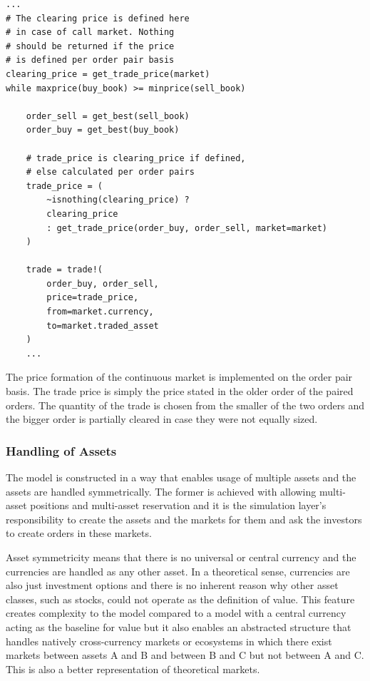 \begin{lstlisting}[caption={Clearing process},label={lst:clearing}]
...
# The clearing price is defined here
# in case of call market. Nothing
# should be returned if the price
# is defined per order pair basis
clearing_price = get_trade_price(market)
while maxprice(buy_book) >= minprice(sell_book)

    order_sell = get_best(sell_book)
    order_buy = get_best(buy_book)
    
    # trade_price is clearing_price if defined,
    # else calculated per order pairs
    trade_price = (
        ~isnothing(clearing_price) ? 
        clearing_price
        : get_trade_price(order_buy, order_sell, market=market)
    )

    trade = trade!(
        order_buy, order_sell, 
        price=trade_price, 
        from=market.currency, 
        to=market.traded_asset
    )
    ...
\end{lstlisting}

The price formation of the continuous market is implemented
on the order pair basis. The trade price is simply the price
stated in the older order of the paired orders. %
The quantity of the trade is chosen from the smaller of the two orders
and the bigger order is partially cleared in case they were not 
equally sized.



\subsubsection{Handling of Assets}

The model is constructed in a way that enables usage of multiple assets
and the assets are handled symmetrically. The former is achieved with
allowing multi-asset positions and multi-asset reservation and 
it is the simulation layer's responsibility to create the assets and the 
markets for them and ask the investors to create orders in these markets. 

Asset symmetricity means that there is no universal or central currency 
and the currencies are handled as any other asset. In a theoretical sense, 
currencies are also just investment options and there is no inherent reason why other 
asset classes, such as stocks, could not operate as the definition 
of value. This feature creates complexity to the model compared to a model
with a central currency acting as the baseline for value but it also enables an
abstracted structure that handles natively cross-currency
markets or ecosystems in which there exist markets between assets A and 
B and between B and C but not between A and C. This is also a better 
representation of theoretical markets.

